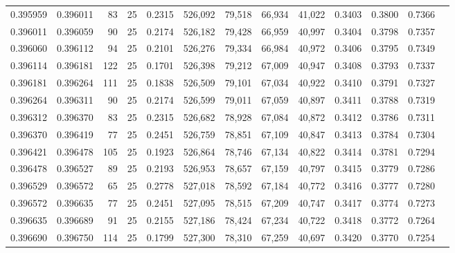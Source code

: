 \begin{tabular}{rrrrrrrrrrrrr}
0.395959 & 0.396011 &    83 &  25 &                                     0.2315 & 526,092 &  79,518 &  66,934 &  41,022 & 0.3403 & 0.3800 & 0.7366 \\
0.396011 & 0.396059 &    90 &  25 &                                     0.2174 & 526,182 &  79,428 &  66,959 &  40,997 & 0.3404 & 0.3798 & 0.7357 \\
0.396060 & 0.396112 &    94 &  25 &                                     0.2101 & 526,276 &  79,334 &  66,984 &  40,972 & 0.3406 & 0.3795 & 0.7349 \\
0.396114 & 0.396181 &   122 &  25 &                                     0.1701 & 526,398 &  79,212 &  67,009 &  40,947 & 0.3408 & 0.3793 & 0.7337 \\
0.396181 & 0.396264 &   111 &  25 &                                     0.1838 & 526,509 &  79,101 &  67,034 &  40,922 & 0.3410 & 0.3791 & 0.7327 \\
0.396264 & 0.396311 &    90 &  25 &                                     0.2174 & 526,599 &  79,011 &  67,059 &  40,897 & 0.3411 & 0.3788 & 0.7319 \\
0.396312 & 0.396370 &    83 &  25 &                                     0.2315 & 526,682 &  78,928 &  67,084 &  40,872 & 0.3412 & 0.3786 & 0.7311 \\
0.396370 & 0.396419 &    77 &  25 &                                     0.2451 & 526,759 &  78,851 &  67,109 &  40,847 & 0.3413 & 0.3784 & 0.7304 \\
0.396421 & 0.396478 &   105 &  25 &                                     0.1923 & 526,864 &  78,746 &  67,134 &  40,822 & 0.3414 & 0.3781 & 0.7294 \\
0.396478 & 0.396527 &    89 &  25 &                                     0.2193 & 526,953 &  78,657 &  67,159 &  40,797 & 0.3415 & 0.3779 & 0.7286 \\
0.396529 & 0.396572 &    65 &  25 &                                     0.2778 & 527,018 &  78,592 &  67,184 &  40,772 & 0.3416 & 0.3777 & 0.7280 \\
0.396572 & 0.396635 &    77 &  25 &                                     0.2451 & 527,095 &  78,515 &  67,209 &  40,747 & 0.3417 & 0.3774 & 0.7273 \\
0.396635 & 0.396689 &    91 &  25 &                                     0.2155 & 527,186 &  78,424 &  67,234 &  40,722 & 0.3418 & 0.3772 & 0.7264 \\
0.396690 & 0.396750 &   114 &  25 &                                     0.1799 & 527,300 &  78,310 &  67,259 &  40,697 & 0.3420 & 0.3770 & 0.7254 \\

\end{tabular}

